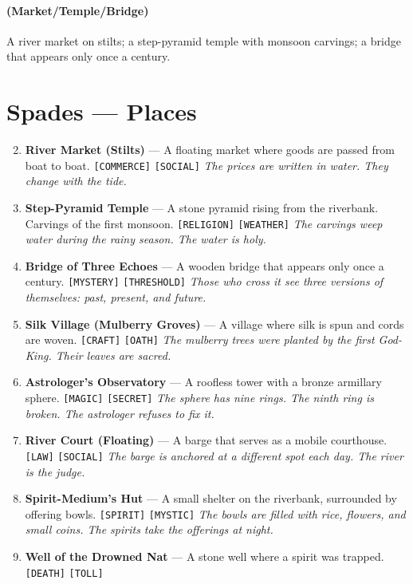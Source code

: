 \paragraph*{(Market/Temple/Bridge)} A river market on stilts; a step-pyramid temple with monsoon carvings; a bridge that appears only once a century.

\section*{Spades --- Places}
\label{sec:ayokha-places}
\begin{enumerate}
\setcounter{enumi}{1}
\item \textbf{River Market (Stilts)} --- A floating market where goods are passed from boat to boat. \texttt{[COMMERCE]} \texttt{[SOCIAL]}
  \hfill \textit{The prices are written in water. They change with the tide.}
\item \textbf{Step-Pyramid Temple} --- A stone pyramid rising from the riverbank. Carvings of the first monsoon. \texttt{[RELIGION]} \texttt{[WEATHER]}
  \hfill \textit{The carvings weep water during the rainy season. The water is holy.}
\item \textbf{Bridge of Three Echoes} --- A wooden bridge that appears only once a century. \texttt{[MYSTERY]} \texttt{[THRESHOLD]}
  \hfill \textit{Those who cross it see three versions of themselves: past, present, and future.}
\item \textbf{Silk Village (Mulberry Groves)} --- A village where silk is spun and cords are woven. \texttt{[CRAFT]} \texttt{[OATH]}
  \hfill \textit{The mulberry trees were planted by the first God-King. Their leaves are sacred.}
\item \textbf{Astrologer's Observatory} --- A roofless tower with a bronze armillary sphere. \texttt{[MAGIC]} \texttt{[SECRET]}
  \hfill \textit{The sphere has nine rings. The ninth ring is broken. The astrologer refuses to fix it.}
\item \textbf{River Court (Floating)} --- A barge that serves as a mobile courthouse. \texttt{[LAW]} \texttt{[SOCIAL]}
  \hfill \textit{The barge is anchored at a different spot each day. The river is the judge.}
\item \textbf{Spirit-Medium's Hut} --- A small shelter on the riverbank, surrounded by offering bowls. \texttt{[SPIRIT]} \texttt{[MYSTIC]}
  \hfill \textit{The bowls are filled with rice, flowers, and small coins. The spirits take the offerings at night.}
\item \textbf{Well of the Drowned Nat} --- A stone well where a spirit was trapped. \texttt{[DEATH]} \texttt{[TOLL]}

\end{enumerate}
